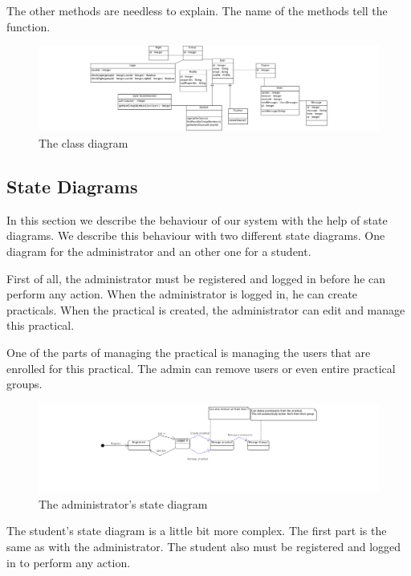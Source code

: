 The other methods are needless to explain.
The name of the methods tell the function.

\begin{figure}[H]
    \centering
    \captionsetup{justification=centering}
    \includegraphics[width=\textwidth, frame]{images/class_diagram}
    \caption{The class diagram}
    \label{class_diagram}
\end{figure}

\subsection{State Diagrams}
In this section we describe the behaviour of our system with the help of state diagrams.
We describe this behaviour with two different state diagrams.
One diagram for the administrator and an other one for a student.

First of all, the administrator must be registered and logged in before he can perform any action.
When the administrator is logged in, he can create practicals.
When the practical is created, the administrator can edit and manage this practical.

One of the parts of managing the practical is managing the users that are enrolled for this practical.
The admin can remove users or even entire practical groups.

\begin{figure}[H]
    \centering
    \captionsetup{justification=centering}
    \includegraphics[width=\textwidth, frame]{images/state_diagram_admin}
    \caption{The administrator's state diagram}
    \label{state_diagram_admin}
\end{figure}

The student's state diagram is a little bit more complex.
The first part is the same as with the administrator.
The student also must be registered and logged in to perform any action.

